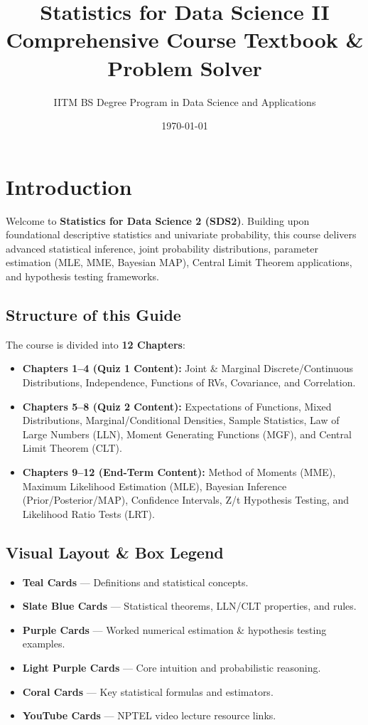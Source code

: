 \documentclass[11pt,a4paper,oneside]{book}
\title{\Huge\bfseries Statistics for Data Science II \\[0.5em] \Large Comprehensive Course Textbook \& Problem Solver}
\author{\Large IITM BS Degree Program in Data Science and Applications}
\date{\today}
\begin{document}
\maketitle

\frontmatter
\tableofcontents
\newpage

\chapter*{Introduction}

Welcome to \textbf{Statistics for Data Science 2 (SDS2)}. Building upon foundational descriptive statistics and univariate probability, this course delivers advanced statistical inference, joint probability distributions, parameter estimation (MLE, MME, Bayesian MAP), Central Limit Theorem applications, and hypothesis testing frameworks.

\section*{Structure of this Guide}
The course is divided into \textbf{12 Chapters}:
\begin{itemize}
    \item \textbf{Chapters 1--4 (Quiz 1 Content):} Joint \& Marginal Discrete/Continuous Distributions, Independence, Functions of RVs, Covariance, and Correlation.
    \item \textbf{Chapters 5--8 (Quiz 2 Content):} Expectations of Functions, Mixed Distributions, Marginal/Conditional Densities, Sample Statistics, Law of Large Numbers (LLN), Moment Generating Functions (MGF), and Central Limit Theorem (CLT).
    \item \textbf{Chapters 9--12 (End-Term Content):} Method of Moments (MME), Maximum Likelihood Estimation (MLE), Bayesian Inference (Prior/Posterior/MAP), Confidence Intervals, Z/t Hypothesis Testing, and Likelihood Ratio Tests (LRT).
\end{itemize}

\section*{Visual Layout \& Box Legend}
\begin{itemize}
    \item \textcolor{tealdef}{\textbf{Teal Cards}} --- Definitions and statistical concepts.
    \item \textcolor{primarydark}{\textbf{Slate Blue Cards}} --- Statistical theorems, LLN/CLT properties, and rules.
    \item \textcolor{purpleex}{\textbf{Purple Cards}} --- Worked numerical estimation \& hypothesis testing examples.
    \item \textcolor{purpleex}{\textbf{Light Purple Cards}} --- Core intuition and probabilistic reasoning.
    \item \textcolor{coralformula}{\textbf{Coral Cards}} --- Key statistical formulas and estimators.
    \item \textcolor{yttext}{\textbf{YouTube Cards}} --- NPTEL video lecture resource links.
\end{itemize}
\end{document}
